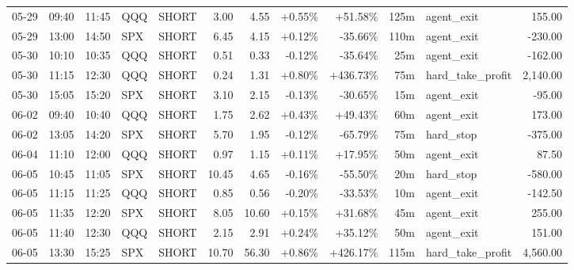 \documentclass[11pt,a4paper,twoside]{article}
\begin{document}
\begin{center}
\begin{longtable}{>{\color{txtmain}}l l l l l r r r r r >{\color{txtmain}}l r}
05-29 & 09:40 & 11:45 & QQQ & SHORT & 3.00 & 4.55 & \textcolor{wingreen}{+0.55\%} & \textcolor{wingreen}{+51.58\%} & 125m & agent\_exit & \textcolor{wingreen}{155.00} \\
05-29 & 13:00 & 14:50 & SPX & SHORT & 6.45 & 4.15 & \textcolor{wingreen}{+0.12\%} & \textcolor{lossred}{-35.66\%} & 110m & agent\_exit & \textcolor{lossred}{-230.00} \\
05-30 & 10:10 & 10:35 & QQQ & SHORT & 0.51 & 0.33 & \textcolor{lossred}{-0.12\%} & \textcolor{lossred}{-35.64\%} & 25m & agent\_exit & \textcolor{lossred}{-162.00} \\
05-30 & 11:15 & 12:30 & QQQ & SHORT & 0.24 & 1.31 & \textcolor{wingreen}{+0.80\%} & \textcolor{wingreen}{+436.73\%} & 75m & hard\_take\_profit & \textcolor{wingreen}{2,140.00} \\
05-30 & 15:05 & 15:20 & SPX & SHORT & 3.10 & 2.15 & \textcolor{lossred}{-0.13\%} & \textcolor{lossred}{-30.65\%} & 15m & agent\_exit & \textcolor{lossred}{-95.00} \\
06-02 & 09:40 & 10:40 & QQQ & SHORT & 1.75 & 2.62 & \textcolor{wingreen}{+0.43\%} & \textcolor{wingreen}{+49.43\%} & 60m & agent\_exit & \textcolor{wingreen}{173.00} \\
06-02 & 13:05 & 14:20 & SPX & SHORT & 5.70 & 1.95 & \textcolor{lossred}{-0.12\%} & \textcolor{lossred}{-65.79\%} & 75m & hard\_stop & \textcolor{lossred}{-375.00} \\
06-04 & 11:10 & 12:00 & QQQ & SHORT & 0.97 & 1.15 & \textcolor{wingreen}{+0.11\%} & \textcolor{wingreen}{+17.95\%} & 50m & agent\_exit & \textcolor{wingreen}{87.50} \\
06-05 & 10:45 & 11:05 & SPX & SHORT & 10.45 & 4.65 & \textcolor{lossred}{-0.16\%} & \textcolor{lossred}{-55.50\%} & 20m & hard\_stop & \textcolor{lossred}{-580.00} \\
06-05 & 11:15 & 11:25 & QQQ & SHORT & 0.85 & 0.56 & \textcolor{lossred}{-0.20\%} & \textcolor{lossred}{-33.53\%} & 10m & agent\_exit & \textcolor{lossred}{-142.50} \\
06-05 & 11:35 & 12:20 & SPX & SHORT & 8.05 & 10.60 & \textcolor{wingreen}{+0.15\%} & \textcolor{wingreen}{+31.68\%} & 45m & agent\_exit & \textcolor{wingreen}{255.00} \\
06-05 & 11:40 & 12:30 & QQQ & SHORT & 2.15 & 2.91 & \textcolor{wingreen}{+0.24\%} & \textcolor{wingreen}{+35.12\%} & 50m & agent\_exit & \textcolor{wingreen}{151.00} \\
06-05 & 13:30 & 15:25 & SPX & SHORT & 10.70 & 56.30 & \textcolor{wingreen}{+0.86\%} & \textcolor{wingreen}{+426.17\%} & 115m & hard\_take\_profit & \textcolor{wingreen}{4,560.00} \\

\end{longtable}
\end{center}
\end{document}
